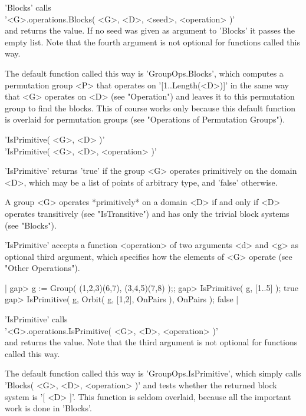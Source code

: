 'Blocks' calls \\
'<G>.operations.Blocks( <G>, <D>, <seed>, <operation> )' \\
and returns the value.  If  no seed was given as  argument to 'Blocks' it
passes the empty list.  Note that the fourth argument is not optional for
functions called this way.

The default function called this way is 'GroupOps.Blocks', which computes
a permutation  group  <P> that operates on '[1..Length(<D>)]' in the same
way  that  <G>  operates on <D>  (see "Operation") and leaves  it to this
permutation group to find the blocks.  This of  course works only because
this default function is overlaid for permutation groups (see "Operations
of Permutation Groups").


'IsPrimitive( <G>, <D> )' \\
'IsPrimitive( <G>, <D>, <operation> )'

'IsPrimitive' returns 'true' if the group <G> operates primitively on the
domain <D>, which may  be a list of points of arbitrary type, and 'false'
otherwise.

A group <G>  operates *primitively*  on a  domain <D> if and only  if <D>
operates transitively (see "IsTransitive") and has only the trivial block
systems (see "Blocks").

'IsPrimitive' accepts a function <operation> of two arguments <d> and <g>
as  optional third argument,   which specifies  how  the elements  of <G>
operate (see "Other Operations").

|    gap> g := Group( (1,2,3)(6,7), (3,4,5)(7,8) );;
    gap> IsPrimitive( g, [1..5] );
    true
    gap> IsPrimitive( g, Orbit( g, [1,2], OnPairs ), OnPairs );
    false |

'IsPrimitive' calls \\
'<G>.operations.IsPrimitive( <G>, <D>, <operation> )' \\
and returns the value.  Note that the  third argument is not optional for
functions called this way.

The  default  function called this way is  'GroupOps.IsPrimitive',  which
simply calls  'Blocks( <G>, <D>,  <operation>  )'  and tests whether  the
returned block  system is '[ <D> ]'.  This function  is  seldom overlaid,
because all the important work is done in 'Blocks'.


